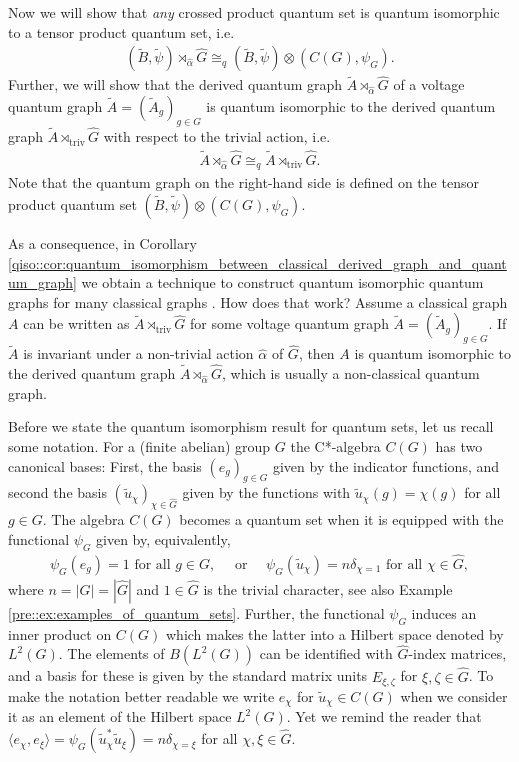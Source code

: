 \documentclass{amsart}
\theoremstyle{definition}
\theoremstyle{definition}
\begin{document}
Now we will show that \emph{any} crossed product quantum set is quantum isomorphic to a tensor product quantum set, i.e.
\begin{align*}
    (\tilde{B}, \tilde{\psi}) \rtimes_{\hat{\alpha}} \hat{G} \cong_q (\tilde{B}, \tilde{\psi}) \otimes (C(G), \psi_G).
\end{align*}
Further, we will show that the derived quantum graph $\tilde{A} \rtimes_{\hat{\alpha}} \hat{G}$ of a voltage quantum graph $\tilde{A} = (\tilde{A}_g)_{g \in G}$ is quantum isomorphic to the derived quantum graph $\tilde{A} \rtimes_{\mathrm{triv}} \hat{G}$ with respect to the trivial action, i.e.
\begin{align*}
    \tilde{A} \rtimes_{\hat{\alpha}} \hat{G} \cong_q \tilde{A} \rtimes_{\mathrm{triv}} \hat{G}.
\end{align*}
Note that the quantum graph on the right-hand side is defined on the tensor product quantum set $(\tilde{B}, \tilde{\psi}) \otimes (C(G), \psi_G)$.

As a consequence, in Corollary \ref{qiso::cor:quantum_isomorphism_between_classical_derived_graph_and_quantum_graph} we obtain a technique to construct quantum isomorphic quantum graphs for many classical graphs .
How does that work? Assume a classical graph $A$ can be written as $\tilde{A} \rtimes_{\mathrm{triv}} \hat{G}$ for some voltage quantum graph $\tilde{A} = (\tilde{A}_g)_{g \in G}$. If $\tilde{A}$ is invariant under a non-trivial action $\hat{\alpha}$ of $\hat{G}$, then $A$ is quantum isomorphic to the derived quantum graph $\tilde{A} \rtimes_{\hat{\alpha}} \hat{G}$, which is usually a non-classical quantum graph. 

Before we state the quantum isomorphism result for quantum sets, let us recall some notation. For a (finite abelian) group $G$ the C*-algebra $C(G)$ has two canonical bases: First, the basis $(e_g)_{g \in G}$ given by the indicator functions, and second the basis $(\tilde{u}_\chi)_{\chi \in \hat{G}}$ given by the functions with $\tilde{u}_\chi(g) = \chi(g)$ for all $g \in G$. The algebra $C(G)$ becomes a quantum set when it is equipped with the functional $\psi_G$ given by, equivalently,
\begin{align*}
    \psi_G(e_g) = 1 \text{ for all } g \in G,
    \quad \text{ or } \quad
    \psi_G(\tilde{u}_\chi) = n \delta_{\chi = 1} \text{ for all } \chi \in \hat{G},
\end{align*}
where $n = |G| = |\hat{G}|$ and $1 \in \hat{G}$ is the trivial character, see also Example \ref{pre::ex:examples_of_quantum_sets}. Further, the functional $\psi_G$ induces an inner product on $C(G)$ which makes the latter into a Hilbert space denoted by $L^2(G)$. The elements of $B(L^2(G))$ can be identified with $\hat{G}$-index matrices, and a basis for these is given by the standard matrix units $E_{\xi, \zeta}$ for $\xi, \zeta \in \hat{G}$.
To make the notation better readable we write $e_\chi$ for $\tilde{u}_\chi \in C(G)$ when we consider it as an element of the Hilbert space $L^2(G)$. Yet we remind the reader that $\langle e_\chi, e_\xi \rangle = \psi_G(\tilde{u}_\chi^\ast \tilde{u}_\xi) = n \delta_{\chi = \xi}$ for all $\chi, \xi \in \hat{G}$.
\end{document}
